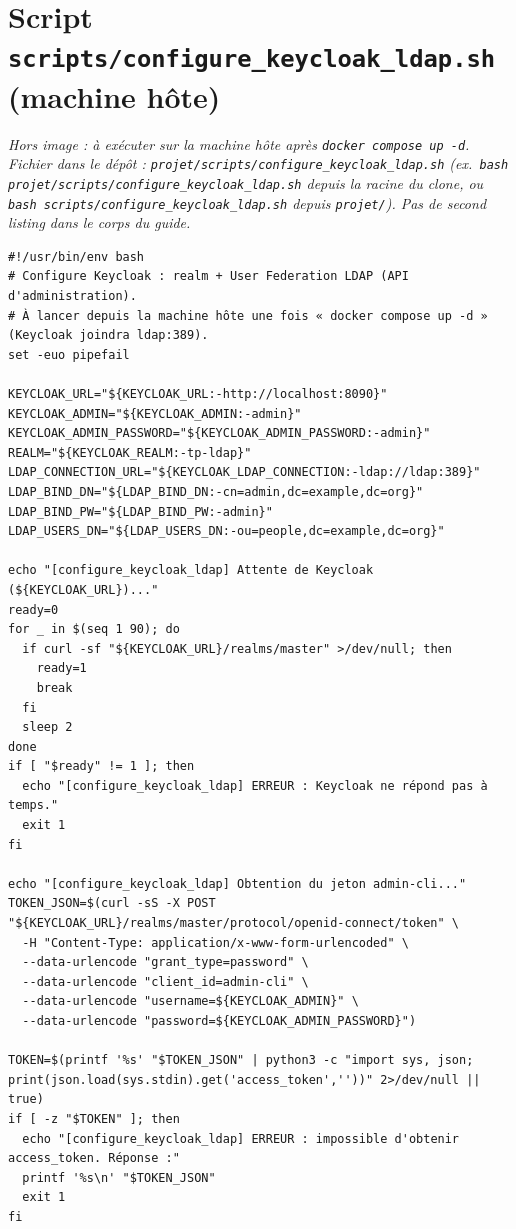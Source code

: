 \section{Script \texttt{scripts/configure\_keycloak\_ldap.sh} (machine hôte)}\label{ann:keycloak-sh}
\noindent\small\textit{Hors image : à exécuter sur la machine hôte après \texttt{docker compose up -d}. Fichier dans le dépôt : \texttt{projet/scripts/configure\_keycloak\_ldap.sh} (ex.\ \texttt{bash projet/scripts/configure\_keycloak\_ldap.sh} depuis la racine du clone, ou \texttt{bash scripts/configure\_keycloak\_ldap.sh} depuis \texttt{projet/}). Pas de second listing dans le corps du guide.}\par\medskip
{\footnotesize
\begin{verbatim}
#!/usr/bin/env bash
# Configure Keycloak : realm + User Federation LDAP (API d'administration).
# À lancer depuis la machine hôte une fois « docker compose up -d » (Keycloak joindra ldap:389).
set -euo pipefail

KEYCLOAK_URL="${KEYCLOAK_URL:-http://localhost:8090}"
KEYCLOAK_ADMIN="${KEYCLOAK_ADMIN:-admin}"
KEYCLOAK_ADMIN_PASSWORD="${KEYCLOAK_ADMIN_PASSWORD:-admin}"
REALM="${KEYCLOAK_REALM:-tp-ldap}"
LDAP_CONNECTION_URL="${KEYCLOAK_LDAP_CONNECTION:-ldap://ldap:389}"
LDAP_BIND_DN="${LDAP_BIND_DN:-cn=admin,dc=example,dc=org}"
LDAP_BIND_PW="${LDAP_BIND_PW:-admin}"
LDAP_USERS_DN="${LDAP_USERS_DN:-ou=people,dc=example,dc=org}"

echo "[configure_keycloak_ldap] Attente de Keycloak (${KEYCLOAK_URL})..."
ready=0
for _ in $(seq 1 90); do
  if curl -sf "${KEYCLOAK_URL}/realms/master" >/dev/null; then
    ready=1
    break
  fi
  sleep 2
done
if [ "$ready" != 1 ]; then
  echo "[configure_keycloak_ldap] ERREUR : Keycloak ne répond pas à temps."
  exit 1
fi

echo "[configure_keycloak_ldap] Obtention du jeton admin-cli..."
TOKEN_JSON=$(curl -sS -X POST "${KEYCLOAK_URL}/realms/master/protocol/openid-connect/token" \
  -H "Content-Type: application/x-www-form-urlencoded" \
  --data-urlencode "grant_type=password" \
  --data-urlencode "client_id=admin-cli" \
  --data-urlencode "username=${KEYCLOAK_ADMIN}" \
  --data-urlencode "password=${KEYCLOAK_ADMIN_PASSWORD}")

TOKEN=$(printf '%s' "$TOKEN_JSON" | python3 -c "import sys, json; print(json.load(sys.stdin).get('access_token',''))" 2>/dev/null || true)
if [ -z "$TOKEN" ]; then
  echo "[configure_keycloak_ldap] ERREUR : impossible d'obtenir access_token. Réponse :"
  printf '%s\n' "$TOKEN_JSON"
  exit 1
fi


\end{verbatim}}
